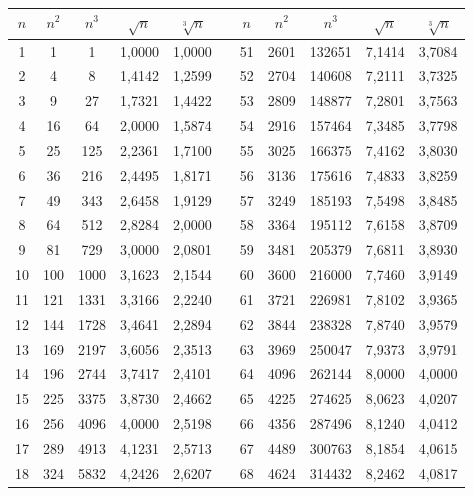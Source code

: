 \documentclass[a4paper,oneside]{book}%
\author{claudio duchi}
\begin{document}
	\begin{longtable}{S@{\hspace{0.1cm}}S@{\hspace{0.1cm}}S@{\hspace{0.1cm}}S@{\hspace{0.1cm}}S@{\hspace{0.1cm}}S@{\hspace{0.1cm}}S@{\hspace{0.1cm}}S@{\hspace{0.1cm}}S@{\hspace{0.1cm}}S@{\hspace{0.1cm}}S} 
		\toprule
		{$n$} &  {$n^2$} & {$n^3$}&{$\sqrt{n}$}&{$\sqrt[3]{n}$}&{ }&{$n$} &  {$n^2$} & {$n^3$}&{$\sqrt{n}$}&{$\sqrt[3]{n}$}  \\
		\midrule \endhead
		\bottomrule \endfoot{}
		1&1&1&1,0000&1,0000&&51&2601&132651&7,1414&3,7084\\
		2&4&8&1,4142&1,2599&&52&2704&140608&7,2111&3,7325\\
		3&9&27&1,7321&1,4422&&53&2809&148877&7,2801&3,7563\\
		4&16&64&2,0000&1,5874&&54&2916&157464&7,3485&3,7798\\
		5&25&125&2,2361&1,7100&&55&3025&166375&7,4162&3,8030\\
		6&36&216&2,4495&1,8171&&56&3136&175616&7,4833&3,8259\\
		7&49&343&2,6458&1,9129&&57&3249&185193&7,5498&3,8485\\
		8&64&512&2,8284&2,0000&&58&3364&195112&7,6158&3,8709\\
		9&81&729&3,0000&2,0801&&59&3481&205379&7,6811&3,8930\\
		10&100&1000&3,1623&2,1544&&60&3600&216000&7,7460&3,9149\\
		11&121&1331&3,3166&2,2240&&61&3721&226981&7,8102&3,9365\\
		12&144&1728&3,4641&2,2894&&62&3844&238328&7,8740&3,9579\\
		13&169&2197&3,6056&2,3513&&63&3969&250047&7,9373&3,9791\\
		14&196&2744&3,7417&2,4101&&64&4096&262144&8,0000&4,0000\\
		15&225&3375&3,8730&2,4662&&65&4225&274625&8,0623&4,0207\\
		16&256&4096&4,0000&2,5198&&66&4356&287496&8,1240&4,0412\\
		17&289&4913&4,1231&2,5713&&67&4489&300763&8,1854&4,0615\\
		18&324&5832&4,2426&2,6207&&68&4624&314432&8,2462&4,0817\\

\end{longtable}
\end{document}
